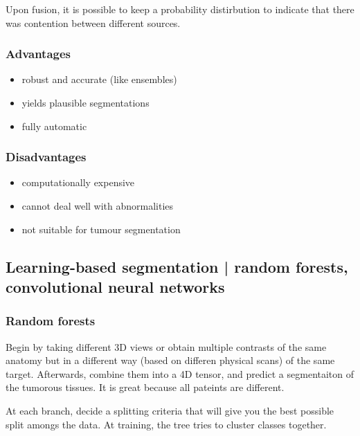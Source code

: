 \documentclass[11pt]{article}
\begin{document}
Upon fusion, it is possible to keep a probability distirbution to indicate that there was contention between different sources.

\subsubsection{Advantages}

\begin{itemize}
    \item robust and accurate (like ensembles)
    \item yields plausible segmentations
    \item fully automatic
\end{itemize}

\subsubsection{Disadvantages}

\begin{itemize}
    \item computationally expensive
    \item cannot deal well with abnormalities
    \item not suitable for tumour segmentation
\end{itemize}

\subsection{Learning-based segmentation | random forests, convolutional neural networks}

\subsubsection{Random forests}

Begin by taking different 3D views or obtain multiple contrasts of the same anatomy but in a different way (based on differen physical scans) of the same target. Afterwards, combine them into a 4D tensor, and predict a segmentaiton of the tumorous tissues. It is great because all pateints are different.

At each branch, decide a splitting criteria that will give you the best possible split amongs the data. At training, the tree tries to cluster classes together.
\end{document}
